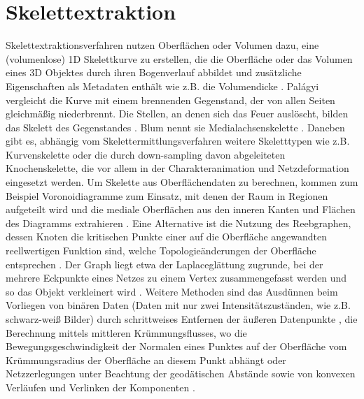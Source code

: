 \section{Skelettextraktion}
Skelettextraktionsverfahren nutzen Oberflächen oder Volumen dazu, eine (volumenlose) 1D Skelettkurve zu erstellen, die die Oberfläche oder das Volumen eines 3D Objektes durch ihren Bogenverlauf abbildet und zusätzliche Eigenschaften als Metadaten enthält wie z.B. die Volumendicke \cite{au2008skeletonExtractionbyMeshContraction}. Palágyi vergleicht die Kurve mit einem brennenden Gegenstand, der von allen Seiten gleichmäßig niederbrennt. Die Stellen, an denen sich das Feuer auslöscht, bilden das Skelett des Gegenstandes \cite{palagyi2008parallelSurfaceThinning}. Blum nennt sie Medialachsenskelette \cite{blum1967descriptorsOfShape}. Daneben gibt es, abhängig vom Skelettermittlungsverfahren weitere Skeletttypen wie z.B. Kurvenskelette \cite{dey2006CurveSkeletonsMedialGeodesicFunction} \cite{cornea2007curveSkeletonProperties} oder die durch down-sampling davon abgeleiteten Knochenskelette, die vor allem in der Charakteranimation \cite{wang2007envelopingRotiationalRegression} und Netzdeformation \cite{weber2007contextAwareSkeletalShapeDeformation} eingesetzt werden.
Um Skelette aus Oberflächendaten zu berechnen, kommen zum Beispiel Voronoidiagramme zum Einsatz, mit denen der Raum in Regionen aufgeteilt wird und die mediale Oberflächen aus den inneren Kanten und Flächen des Diagramms extrahieren \cite{dey2006CurveSkeletonsMedialGeodesicFunction}. Eine Alternative ist die Nutzung des Reebgraphen, dessen Knoten die kritischen Punkte einer auf die Oberfläche angewandten reellwertigen Funktion sind, welche Topologieänderungen der Oberfläche entsprechen \cite{pascucci2007computationReebGraph}. Der Graph liegt etwa der Laplaceglättung zugrunde, bei der mehrere Eckpunkte eines Netzes zu einem Vertex zusammengefasst werden und so das Objekt verkleinert wird \cite{au2008skeletonExtractionbyMeshContraction}. Weitere Methoden sind das Ausdünnen beim Vorliegen von binären Daten (Daten mit nur zwei Intensitätszuständen, wie z.B. schwarz-weiß Bilder) durch schrittweises Entfernen der äußeren Datenpunkte \cite{palagyi2008parallelSurfaceThinning}, die Berechnung mittels mittleren Krümmungsflusses, wo die Bewegungsgeschwindigkeit der Normalen eines Punktes auf der Oberfläche vom Krümmungsradius der Oberfläche an diesem Punkt abhängt \cite{tagliasacchi2012meanCurvatureSkeletons} oder Netzzerlegungen unter Beachtung der geodätischen Abstände sowie von konvexen Verläufen und Verlinken der Komponenten \cite{katz2003meshDecomposition}.
